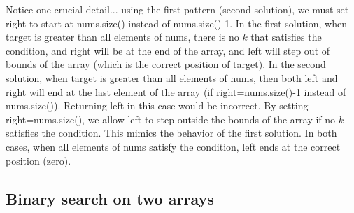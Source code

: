 \documentclass{report}
\begin{document}
   \bigbreak \noindent 
   Notice one crucial detail... using the first pattern (second solution), we must set right to start at nums.size() instead of nums.size()-1.
   \bigbreak \noindent 
   In the first solution, when target is greater than all elements of nums, there is no $k$ that satisfies the condition, and right will be at the end of the array, and left will step out of bounds of the array (which is the correct position of target).
   \bigbreak \noindent 
   In the second solution, when target is greater than all elements of nums, then both left and right will end at the last element of the array (if right=nums.size()-1 instead of nums.size()). Returning left in this case would be incorrect. By setting right=nums.size(), we allow left to step outside the bounds of the array if no $k$ satisfies the condition. This mimics the behavior of the first solution.
   \bigbreak \noindent 
   In both cases, when all elements of nums satisfy the condition, left ends at the correct position (zero).

   \bigbreak \noindent 
   \subsection{Binary search on two arrays}
   \bigbreak \noindent 
\end{document}
